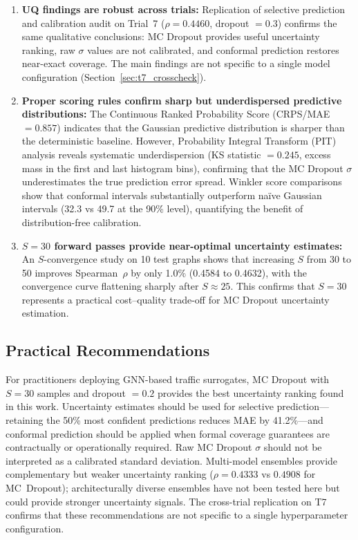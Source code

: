 \begin{enumerate}
    \item \textbf{UQ findings are robust across trials:} Replication of selective prediction and calibration audit on Trial~7 ($\rho = 0.4460$, dropout $= 0.3$) confirms the same qualitative conclusions: MC Dropout provides useful uncertainty ranking, raw $\sigma$ values are not calibrated, and conformal prediction restores near-exact coverage. The main findings are not specific to a single model configuration (Section~\ref{sec:t7_crosscheck}).

    \item \textbf{Proper scoring rules confirm sharp but underdispersed predictive distributions:} The Continuous Ranked Probability Score (CRPS/MAE $= 0.857$) indicates that the Gaussian predictive distribution is sharper than the deterministic baseline. However, Probability Integral Transform (PIT) analysis reveals systematic underdispersion (KS statistic $= 0.245$, excess mass in the first and last histogram bins), confirming that the MC Dropout $\sigma$ underestimates the true prediction error spread. Winkler score comparisons show that conformal intervals substantially outperform na\"{i}ve Gaussian intervals (32.3 vs 49.7 at the 90\% level), quantifying the benefit of distribution-free calibration.

    \item \textbf{$S = 30$ forward passes provide near-optimal uncertainty estimates:} An $S$-convergence study on 10 test graphs shows that increasing $S$ from 30 to 50 improves Spearman~$\rho$ by only 1.0\% (0.4584 to 0.4632), with the convergence curve flattening sharply after $S \approx 25$. This confirms that $S = 30$ represents a practical cost--quality trade-off for MC Dropout uncertainty estimation.
\end{enumerate}

\subsection{Practical Recommendations}

For practitioners deploying GNN-based traffic surrogates, MC Dropout with $S = 30$ samples and dropout $= 0.2$ provides the best uncertainty ranking found in this work. Uncertainty estimates should be used for selective prediction---retaining the 50\% most confident predictions reduces MAE by 41.2\%---and conformal prediction should be applied when formal coverage guarantees are contractually or operationally required. Raw MC Dropout $\sigma$ should not be interpreted as a calibrated standard deviation.  Multi-model ensembles provide complementary but weaker uncertainty ranking ($\rho = 0.4333$ vs $0.4908$ for MC~Dropout); architecturally diverse ensembles have not been tested here but could provide stronger uncertainty signals. The cross-trial replication on T7 confirms that these recommendations are not specific to a single hyperparameter configuration.

